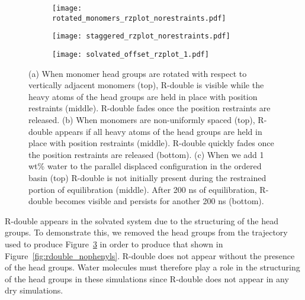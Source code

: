 \begin{figure}[!htb]
\begin{subfigure}{0.325\linewidth}
  	\centering
  	\texttt{[image: rotated\_monomers\_rzplot\_norestraints.pdf]}
  	\caption{}\label{fig:rotated_monomers_rzplot_norestraints}
  \end{subfigure}
  \begin{subfigure}{0.325\linewidth}
  	\centering
  	\texttt{[image: staggered\_rzplot\_norestraints.pdf]}
  	\caption{}\label{fig:staggered_rzplot_norestraints} 
  \end{subfigure}
  \begin{subfigure}{0.325\linewidth}
  	\centering
  	\texttt{[image: solvated\_offset\_rzplot\_1.pdf]}
  	\caption{}\label{fig:solvated_pore_rzplot_norestraints}
  \end{subfigure}
  \caption{(a) When monomer head groups are rotated with respect to vertically
	  adjacent monomers (top), R-double is visible while the heavy atoms of the head
	  groups are held in place with position restraints (middle). R-double
	  fades once the position restraints are released. (b) When monomers are
	  non-uniformly spaced (top), R-double appears if all heavy atoms of the head
	  groups are held in place with position restraints (middle). R-double quickly
	  fades once the position restraints are released (bottom). (c) When we add 1
	  wt\% water to the parallel displaced configuration in the ordered basin (top)
	  R-double is not initially present during the restrained portion of
	  equilibration (middle).  After 200 ns of equilibration, R-double becomes
	  visible and persists for another 200 ns (bottom).}\label{fig:rdouble}
  \end{figure}

  R-double appears in the solvated system due to the structuring of the head
  groups. To demonstrate this, we removed the head groups from the trajectory
  used to produce Figure~\ref{fig:solvated_pore_rzplot_norestraints} in order to
  produce that shown in Figure~\ref{fig:rdouble_nophenyls}. R-double does not
  appear without the presence of the head groups. Water molecules must therefore
  play a role in the structuring of the head groups in these simulations since
  R-double does not appear in any dry simulations.



